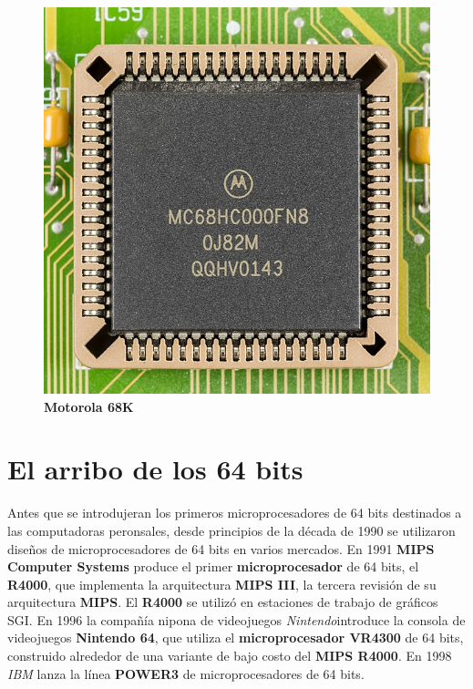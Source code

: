 \begin{figure}[htb]
	\centering
	\includegraphics[scale = 0.15]{Graphics/Motorola_MC68HC000FN8-0695.jpg}
	\caption{\textbf{Motorola 68K}}
	\label{fig:17}
\end{figure}

\section{El arribo de los 64 bits}
Antes que se introdujeran los primeros microprocesadores de 64 bits destinados a las computadoras peronsales, desde principios de la década de
1990 se utilizaron diseños de microprocesadores de 64 bits en varios mercados. En 1991 \textbf{MIPS Computer Systems} produce el primer \textbf
{microprocesador} de 64 bits, el \textbf{R4000}, que implementa la arquitectura \textbf{MIPS III}, la tercera revisión de su arquitectura \textbf{MIPS}.
El \textbf{R4000} se utilizó en estaciones de trabajo de gráficos SGI. En 1996 la compañía nipona de videojuegos \emph{Nintendo}introduce la consola de
videojuegos \textbf{Nintendo 64}, que utiliza el \textbf{microprocesador VR4300} de 64 bits, construido alrededor de una variante de bajo costo del
\textbf{MIPS R4000}. En 1998 \emph{IBM} lanza la línea \textbf{POWER3} de microprocesadores de 64 bits. 

